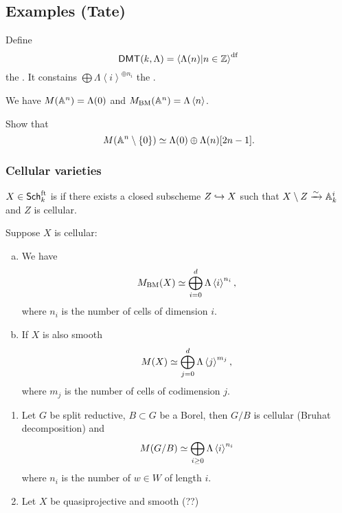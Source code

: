 \subsection{Examples (Tate)}
\begin{definition}
	Define
	\[
		\mathsf{DMT}(k,\Lambda) = \left<\Lambda(n) | n\in \mathbb Z \right>^{\text{df}}
	\] 
	the . It constains $\bigoplus \Lambda\left<i \right>^{\oplus n_i}$ the .
\end{definition}
We have $M(\mathbb A^{n})=\Lambda(0)$ and $M_{\text{BM}}(\mathbb A^{n}) = \Lambda\left<n \right>$.
\begin{exercise}
	Show that
	\[
		M(\mathbb A^{n}\setminus \{0\}) \simeq \Lambda(0) \oplus \Lambda(n)[2n-1].
	\] 
\end{exercise}
\subsubsection{Cellular varieties}
\begin{definition}
	$X\in \mathsf{Sch}_k^{\text{ft}}$ is  if there exists a closed subscheme $Z\hookrightarrow X$ such that $X\setminus Z\xrightarrow{\sim} \mathbb A_k^{i}$ and $Z$ is cellular.
\end{definition}
\begin{proposition}
	Suppose $X$ is cellular:
	\begin{enumerate}[a)]
		\item We have
			\[
			M_{\text{BM}}(X) \simeq \bigoplus_{i=0}^{d}\Lambda\left<i \right>^{n_i},
			\] 
			where $n_i$ is the number of cells of dimension $i$.
		\item If $X$ is also smooth
			\[
			M(X) \simeq \bigoplus_{j=0}^{d}\Lambda\left<j \right>^{m_j},
			\] 
			where $m_j$ is the number of cells of codimension $j$.
	\end{enumerate}
\end{proposition}
\begin{example}\leavevmode
	\begin{enumerate}[1)]
		\item Let $G$ be split reductive, $B\subset G$ be a Borel, then $G /B$ is cellular (Bruhat decomposition) and
			\[
			M(G /B) \simeq \bigoplus_{i\ge 0}\Lambda\left<i \right>^{n_i}
			\] 
			where $n_i$ is the number of $w\in W$ of length $i$.
		\item Let $X$ be quasiprojective and smooth (??)
	\end{enumerate}
\end{example}

